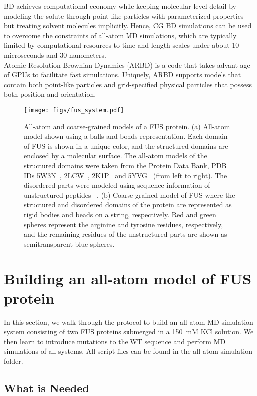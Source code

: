 \documentclass[letterpaper]{article}
\begin{document}
BD achieves computational economy while keeping molecular-level detail by modeling the solute through point-like particles with parameterized properties but treating solvent molecules implicitly. Hence, CG BD simulations can be used to overcome the constraints of all-atom MD simulations, which are typically limited by computational resources to time and length scales under about 10 microseconds and 30 nanometers.\\[0.02cm]

Atomic Resolution Brownian Dynamics (ARBD) is a code that takes advant-age of GPUs to facilitate fast simulations. Uniquely, ARBD supports models that contain both point-like particles and grid-specified physical particles that possess both position and orientation.

\newpage
\begin{figure}
\centering
\texttt{[image: figs/fus\_system.pdf]}
\caption{\small
All-atom and coarse-grained models of a FUS protein. 
(a)  All-atom model shown using a balls-and-bonds representation. Each domain of FUS is shown in a unique color, and  
the structured domains are enclosed by a molecular surface. The all-atom models of the structured domains were taken from  the 
Protein Data Bank,  PDB IDs 5W3N~\cite{MURR2017}, 2LCW~\cite{LIU2013}, 2K1P~\cite{LOUG2009} and 5YVG~\cite{YOSH2018} (from left to right). The disordered parts were modeled using sequence 
information of unstructured peptides
 ~\cite{YOSH2018}. 
(b) Coarse-grained model of FUS where the structured and disordered domains of the protein are represented as rigid bodies and beads on a string, respectively. Red and green spheres represent the arginine and tyrosine residues, respectively, and the remaining residues of the unstructured parts are shown as semitransparent blue spheres. 
}
\label{fig:FUS}
\end{figure}


\section{Building an all-atom model of FUS protein}
In this section, we walk through the protocol to build an all-atom MD simulation system consisting of two FUS proteins submerged in a 150~mM KCl solution. We then learn to introduce mutations to the WT sequence and perform MD simulations of all systems. All script files can be found in the all-atom-simulation folder.

\subsection{What is Needed}
\end{document}
